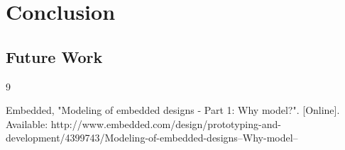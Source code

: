 \documentclass{report}
\begin{document}
\chapter{Conclusion}

	\section{Future Work}

\newpage
	
\begin{thebibliography} {9}
	
	 Embedded, "Modeling of embedded designs - Part 1: Why model?". [Online]. Available: http://www.embedded.com/design/prototyping-and-development/4399743/Modeling-of-embedded-designs--Why-model--
			
\end{thebibliography}
	
\end{document}
